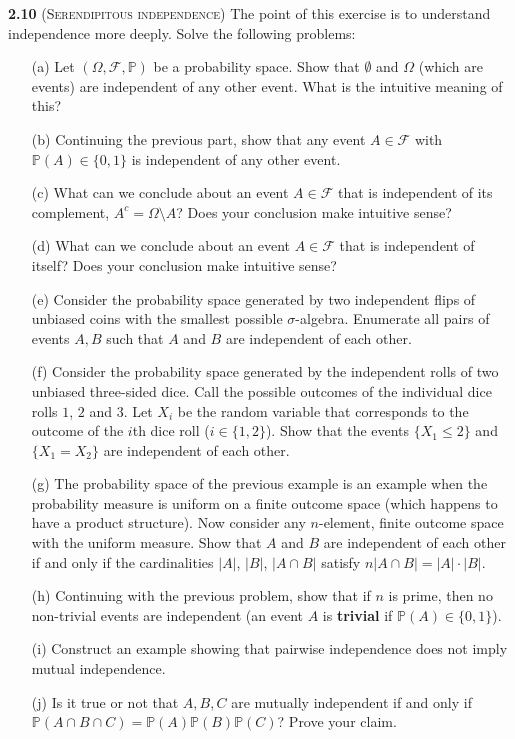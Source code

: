 \noindent\textbf{2.10}
(\textsc{Serendipitous independence}) The point of this exercise is to understand independence more deeply. Solve the following problems:
\begin{enumerate}
    \item[(a)] Let $(\Omega,\mathcal{F},\mathbb{P})$ be a probability space.
    Show that $\emptyset$ and $\Omega$ (which are events) are independent of any other event. What is the intuitive meaning of this?
    \item[(b)] Continuing the previous part, show that any event $A\in\mathcal{F}$ with $\mathbb{P}(A)\in \{0, 1\}$ is independent of any other event.
    \item[(c)] What can we conclude about an event $A \in\mathcal{F}$ that is independent of its complement,
    $A^c =\Omega\setminus A$? Does your conclusion make intuitive sense?
    \item[(d)] What can we conclude about an event $A\in\mathcal{F}$ that is independent of itself?
        Does your conclusion make intuitive sense?
    \item[(e)] Consider the probability space generated by two independent flips of unbiased
        coins with the smallest possible $\sigma$-algebra. Enumerate all pairs of events
        $A,B$ such that $A$ and $B$ are independent of each other.
    \item[(f)] Consider the probability space generated by the independent rolls of two
        unbiased three-sided dice. Call the possible outcomes of the individual dice
        rolls $1$, $2$ and $3$. Let $X_i$ be the random variable that corresponds to the
        outcome of the $i$th dice roll ($i\in \{1, 2\}$). Show that the events $\{X_1 \leq 2\}$ and
        $\{X_1 = X_2\}$ are independent of each other.
    \item[(g)] The probability space of the previous example is an example when the
        probability measure is uniform on a finite outcome space (which happens to
        have a product structure). Now consider any $n$-element, finite outcome space
        with the uniform measure. Show that $A$ and $B$ are independent of each other
        if and only if the cardinalities $|A|$, $|B|$, $|A \cap B|$ satisfy $n|A \cap B|=|A| \cdot |B|$.
    \item[(h)] Continuing with the previous problem, show that if $n$ is prime, then no
        non-trivial events are independent (an event $A$ is \textbf{trivial} if $\mathbb{P} (A) \in \{0, 1\}$).
    \item[(i)] Construct an example showing that pairwise independence does not imply
        mutual independence.
    \item[(j)] Is it true or not that $A,B,C$ are mutually independent if and only if
        $\mathbb{P}(A \cap B \cap C) = \mathbb{P}(A) \mathbb{P}(B) \mathbb{P}(C)$? Prove your claim.
\end{enumerate}

